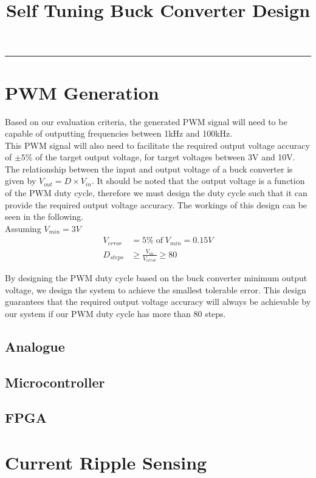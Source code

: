 \documentclass[a4paper,11pt]{article}
\title{\LARGE{\textbf{Self Tuning Buck Converter Design}}}
\author{}
\date{}
\begin{document}
\maketitle
\vspace{-20pt}
\hrule

\section{PWM Generation}

Based on our evaluation criteria, the generated PWM signal will need to be capable of outputting frequencies between 1kHz and 100kHz. \\

This PWM signal will also need to facilitate the required output voltage accuracy of $\pm5\%$ of the target output voltage, for target voltages between 3V and 10V. The relationship between the input and output voltage of a buck converter is given by $V_{out} = D \times V_{in}$. It should be noted that the output voltage is a function of the PWM duty cycle, therefore we must design the duty cycle such that it can provide the required output voltage accuracy. The workings of this design can be seen in the following.\\

Assuming $V_{min} = 3V$ 
\begin{align*}
    V_{error} &= 5\% \mathrm{\; of \;} V_{min} = 0.15V\\
    D_{steps} &\ge \frac{V_{in}}{V_{error}} \ge 80
\end{align*}

By designing the PWM duty cycle based on the buck converter minimum output voltage, we design the system to achieve the smallest tolerable error. This design guarantees that the required output voltage accuracy will always be achievable by our system if our PWM duty cycle has more than 80 steps. 

\subsection{Analogue}

\subsection{Microcontroller}

\subsection{FPGA}


\section{Current Ripple Sensing}
\end{document}

